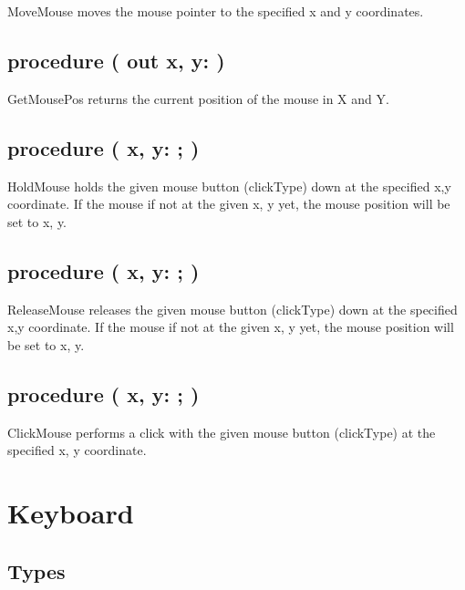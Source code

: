 \documentclass[a4paper]{report}
\begin{document}
MoveMouse moves the mouse pointer to the specified x and y coordinates.

\subsection{\textbf{procedure} {\color{blue}{GetMousePos}}({\color{typeRed}
{out x, y: }}{\color{typeGreen}{Integer}})}

GetMousePos returns the current position of the mouse in X and Y.

\subsection{\textbf{procedure} {\color{blue}{HoldMouse}}({\color{typeRed}
{x, y: }}{\color{typeGreen}{Integer}}; {\color{typeRed}{clickType :}}
{\color{typeGreen}{clickType}})}

HoldMouse holds the given mouse button (clickType) down at the specified x,y 
coordinate. If the mouse if not at the given x, y yet, the mouse position
will be set to x, y.

\subsection{\textbf{procedure} {\color{blue}{ReleaseMouse}}({\color{typeRed}
{x, y: }}{\color{typeGreen}{Integer}}; {\color{typeRed}{clickType :}}
{\color{typeGreen}{clickType}})}

ReleaseMouse releases the given mouse button (clickType) down at the specified x,y 
coordinate. If the mouse if not at the given x, y yet, the mouse position
will be set to x, y.

\subsection{\textbf{procedure} {\color{blue}{ClickMouse}}({\color{typeRed}
{x, y: }}{\color{typeGreen}{Integer}}; {\color{typeRed}{clickType :}}
{\color{typeGreen}{clickType}})}

ClickMouse performs a click with the given mouse button (clickType) at the
specified x, y coordinate.

\section{Keyboard}

\subsection{Types}
\end{document}
